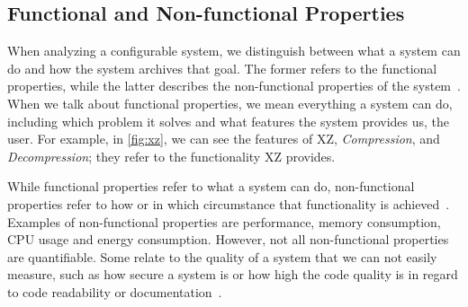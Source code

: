 \subsection{Functional and Non-functional Properties}\label{ch:properties}

When analyzing a configurable system, we distinguish between what a system can do and how the system archives that goal.
The former refers to the functional properties, while the latter describes the non-functional properties of the system~\cite{non-functional-Properties}.
When we talk about functional properties, we mean everything a system can do, including which problem it solves and what features the system provides us, 
the user.
For example, in \autoref{fig:xz}, we can see the features of \textsc{XZ}, \textit{Compression}, 
and \textit{Decompression}; they refer to the functionality \textsc{XZ} provides.

While functional properties refer to what a system can do, non-functional properties refer to how or in which circumstance
that functionality is achieved~\cite{non-functional-Properties}.
Examples of non-functional properties are performance, memory consumption, CPU usage and energy consumption. 
However, not all non-functional properties are quantifiable. Some relate to the quality of a system that we can not easily measure, such as
how secure a system is or how high the code quality is in regard to code readability or documentation~\cite{non-functional-Properties}.
